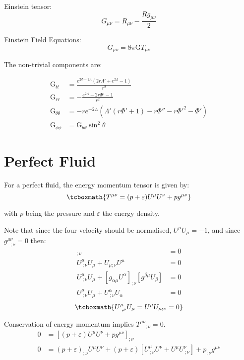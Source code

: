 \documentclass[12pt, letterpaper]{report}
\newcommand{\T}[2]{(p+\varepsilon)U^{#1} U^{#2}+ pg^{#1#2}}
\begin{document}
Einstein tensor:
$$G_{\mu \nu }=R_{\mu \nu }-\frac{R g_{\mu \nu }}{2}$$

Einstein Field Equations: 
$$G_{\mu \nu }=8\pi \text{G}T_{\mu \nu }$$

The non-trivial components are: 

\begin{align*}
    \text{G}_{tt} &= \frac{e^{2 \Phi-2 \Lambda } \left(2 r \Lambda '+e^{2 \Lambda}-1\right)}{r^2}\\
    \text{G}_{rr} &= -\frac{e^{2 \Lambda}-2 r \Phi '-1}{r^2}\\
    \text{G}_{\theta \theta } &= -r e^{-2 \Lambda } \left(\Lambda ' \left(r \Phi '+1\right)-r \Phi ''-r \Phi '^2-\Phi '\right)\\
    \text{G}_{\phi \phi } &= \text{G}_{\theta \theta }\sin ^2\theta 
\end{align*}


\section{Perfect Fluid} \label{sec perfect fluid}

For a perfect fluid, the energy momentum tensor is given by: 
\begin{equation}
    \tcboxmath{T^{\mu\nu}= \T{\mu}{\nu}}\label{eq1.2}
\end{equation}

with $p$ being the pressure and $\varepsilon$ the energy density. 

Note that since the four velocity should be normalised, $U^\mu U_\mu = -1$, and since $g^{\mu\nu}_{\ \ \ ;\nu}= 0$ then: 
\begin{align*}
    [U^\mu U_\mu]_{;\nu} &= 0\\
    U^\mu_{\ ;\nu}U_\mu + U_{\mu;\nu}U^\mu &= 0\\
    U^\mu_{\ ;\nu}U_\mu + [g_{\alpha\mu}U^\alpha]_{;\nu}[g^{\beta\mu}U_\beta] &= 0\\
    U^\mu_{\ ;\nu}U_\mu + U^\alpha_{\ ;\nu}U_\alpha &= 0
\end{align*}
\begin{equation} 
    \tcboxmath{U^\mu_{\ ;\nu}U_\mu= U^\mu U_{\mu;\nu}= 0} \label{eq1.3}
\end{equation}

Conservation of energy momentum implies $T^{\mu\nu}{}_{;\nu}=0$. 
\begin{align*}
    0 &= \left[\T{\mu}{\nu}\right]_{;\nu}\\
    0 &= (p+\varepsilon)_{;\nu}U^\mu U^\nu+ (p+\varepsilon)[U^\mu_{\ ;\nu} U^\nu + U^\mu U^\nu_{\ ;\nu}] + p_{;\nu}g^{\mu\nu}
\end{align*}
\end{document}

